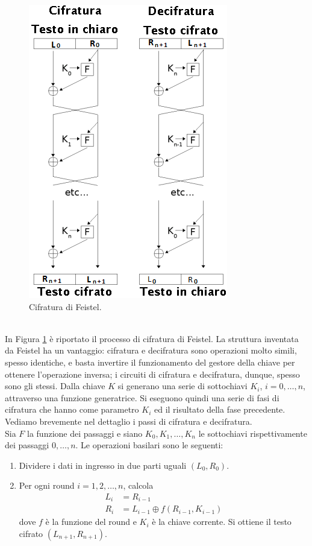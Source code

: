 \begin{figure}[htbp]
	\centering
	\includegraphics[scale = 0.6]{images/Feistel}
	\caption{Cifratura di Feistel.}
	\label{img:Feistel}
\end{figure}\\
In Figura \ref{img:Feistel} è riportato il processo di cifratura di Feistel. La struttura inventata da Feistel ha un vantaggio: cifratura e decifratura sono operazioni molto simili, spesso identiche, e basta invertire il funzionamento del gestore della chiave per ottenere l'operazione inversa; i circuiti di cifratura e decifratura, dunque, spesso sono gli stessi. Dalla chiave $K$ si generano una serie di sottochiavi $K_i$, $i=0,\dots,n$, attraverso una funzione generatrice. Si eseguono quindi una serie di fasi di cifratura che hanno come parametro $K_i$ ed il risultato della fase precedente. Vediamo brevemente nel dettaglio i passi di cifratura e decifratura.\\
Sia $F$ la funzione dei passaggi e siano $K_0, K_1, \dots, K_n$ le sottochiavi rispettivamente dei passaggi $0,\dots,n$. Le operazioni basilari sono le seguenti:
\begin{enumerate}
	\item Dividere i dati in ingresso in due parti uguali $(L_0, R_0)$.
	\item Per ogni round $i=1,2,\dots,n$, calcola
	\begin{align*}
		L_i &= R_{i-1} \\
		R_i &= L_{i-1} \oplus f(R_{i-1}, K_{i-1})
	\end{align*}
	dove $f$ è la funzione del round e $K_i$ è la chiave corrente. Si ottiene il testo cifrato $(L_{n+1}, R_{n+1})$.
\end{enumerate}
